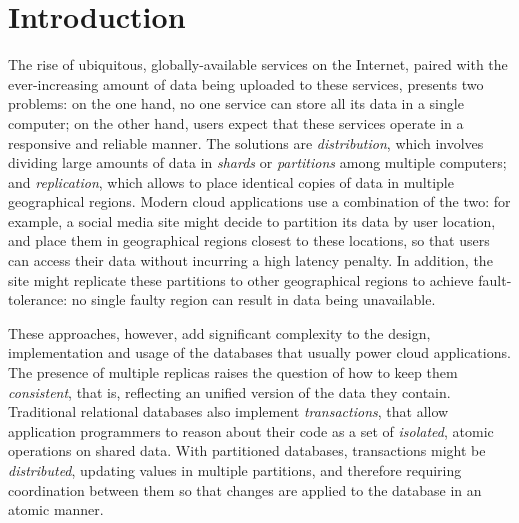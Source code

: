 \cleardoublepage
\chapter{Introduction}


The rise of ubiquitous, globally-available services on the Internet, paired with the ever-increasing amount of data being uploaded to these services, presents two problems: on the one hand, no one service can store all its data in a single computer; on the other hand, users expect that these services operate in a responsive and reliable manner. The solutions are \emph{distribution}, which involves dividing large amounts of data in \emph{shards} or \emph{partitions} among multiple computers; and \emph{replication}, which allows to place identical copies of data in multiple geographical regions. Modern cloud applications use a combination of the two: for example, a social media site might decide to partition its data by user location, and place them in geographical regions closest to these locations, so that users can access their data without incurring a high latency penalty. In addition, the site might replicate these partitions to other geographical regions to achieve fault-tolerance: no single faulty region can result in data being unavailable.

These approaches, however, add significant complexity to the design, implementation and usage of the databases that usually power cloud applications. The presence of multiple replicas raises the question of how to keep them \emph{consistent}, that is, reflecting an unified version of the data they contain. Traditional relational databases also implement \emph{transactions}, that allow application programmers to reason about their code as a set of \emph{isolated}, atomic operations on shared data. With partitioned databases, transactions might be \emph{distributed}, updating values in multiple partitions, and therefore requiring coordination between them so that changes are applied to the database in an atomic manner.

